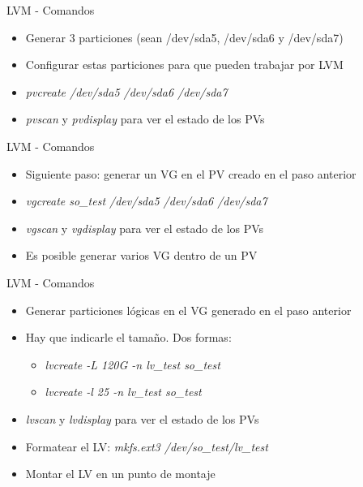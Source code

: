 \begin{frame}{LVM - Comandos}
  \begin{itemize}
   \item Generar 3 particiones (sean /dev/sda5, /dev/sda6 y /dev/sda7)
   \item Configurar estas particiones para que pueden trabajar por LVM
   \item {\it pvcreate /dev/sda5 /dev/sda6 /dev/sda7}  
   \item {\it pvscan} y {\it pvdisplay} para ver el estado de los PVs
  \end{itemize}
\end{frame}

\begin{frame}{LVM - Comandos}
  \begin{itemize}
   \item Siguiente paso: generar un VG en el PV creado en el paso anterior
   \item {\it vgcreate so\_test /dev/sda5 /dev/sda6 /dev/sda7}
   \item {\it vgscan} y {\it vgdisplay} para ver el estado de los PVs
   \item Es posible generar varios VG dentro de un PV
  \end{itemize}
\end{frame}

\begin{frame}{LVM - Comandos}
  \begin{itemize}
   \item Generar particiones lógicas en el VG generado en el paso anterior 
   \item Hay que indicarle el tamaño. Dos formas:
   \begin{itemize}
    \item {\it lvcreate -L 120G -n lv\_test so\_test }
    \item {\it lvcreate -l 25 -n lv\_test so\_test }  
   \end{itemize}
   \item {\it lvscan} y {\it lvdisplay} para ver el estado de los PVs
   \item Formatear el LV: {\it mkfs.ext3 /dev/so\_test/lv\_test}  
   \item Montar el LV en un punto de montaje 
  \end{itemize}
\end{frame}

